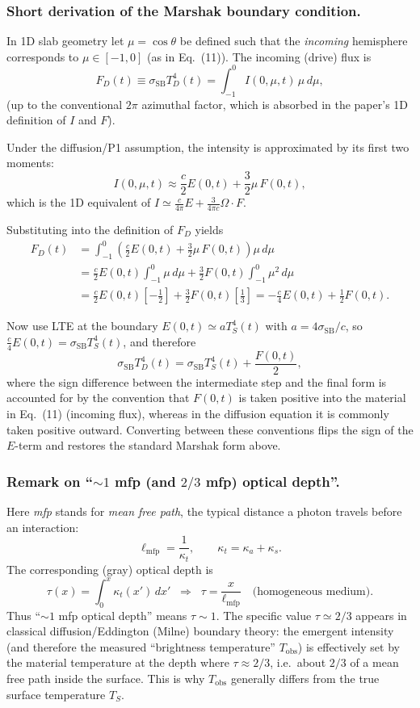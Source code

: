 \documentclass{article}
\begin{document}
\subsubsection*{Short derivation of the Marshak boundary condition.}
In 1D slab geometry let $\mu=\cos\theta$ be defined such that the \emph{incoming}
hemisphere corresponds to $\mu\in[-1,0]$ (as in Eq.~(11)).
The incoming (drive) flux is
\[
F_D(t)\equiv \sigma_{\mathrm{SB}}T_D^4(t)
= \int_{-1}^{0} I(0,\mu,t)\,\mu\,d\mu ,
\]
(up to the conventional $2\pi$ azimuthal factor, which is absorbed in the paper's
1D definition of $I$ and $F$).

Under the diffusion/P1 assumption, the intensity is approximated by its first two
moments:
\[
I(0,\mu,t)\approx \frac{c}{2}E(0,t)+\frac{3}{2}\mu\,F(0,t),
\]
which is the 1D equivalent of $I\simeq \frac{c}{4\pi}E+\frac{3}{4\pi c}\Omega\cdot F$.

Substituting into the definition of $F_D$ yields
\begin{align*}
F_D(t)
&=\int_{-1}^{0}\left(\frac{c}{2}E(0,t)+\frac{3}{2}\mu\,F(0,t)\right)\mu\,d\mu \\
&=\frac{c}{2}E(0,t)\int_{-1}^{0}\mu\,d\mu+\frac{3}{2}F(0,t)\int_{-1}^{0}\mu^2\,d\mu \\
&=\frac{c}{2}E(0,t)\left[-\frac{1}{2}\right]+\frac{3}{2}F(0,t)\left[\frac{1}{3}\right]
= -\frac{c}{4}E(0,t)+\frac{1}{2}F(0,t).
\end{align*}

Now use LTE at the boundary $E(0,t)\simeq aT_S^4(t)$ with $a=4\sigma_{\mathrm{SB}}/c$,
so $\frac{c}{4}E(0,t)=\sigma_{\mathrm{SB}}T_S^4(t)$, and therefore
\[
\sigma_{\mathrm{SB}}T_D^4(t)
= \sigma_{\mathrm{SB}}T_S^4(t)+\frac{F(0,t)}{2},
\]
where the sign difference between the intermediate step and the final form is
accounted for by the convention that $F(0,t)$ is taken positive into the material
in Eq.~(11) (incoming flux), whereas in the diffusion equation it is commonly
taken positive outward. Converting between these conventions flips the sign of
the $E$-term and restores the standard Marshak form above. 

\subsubsection*{Remark on ``$\sim 1$ mfp (and $2/3$ mfp) optical depth''.}
Here \emph{mfp} stands for \emph{mean free path}, the typical distance a photon
travels before an interaction:
\[
\ell_{\mathrm{mfp}}=\frac{1}{\kappa_t},\qquad \kappa_t=\kappa_a+\kappa_s.
\]
The corresponding (gray) optical depth is
\[
\tau(x)=\int_0^x \kappa_t(x')\,dx' \;\;\Rightarrow\;\;
\tau=\frac{x}{\ell_{\mathrm{mfp}}}\quad \text{(homogeneous medium)}.
\]
Thus ``$\sim 1$ mfp optical depth'' means $\tau\sim 1$.
The specific value $\tau\simeq 2/3$ appears in classical diffusion/Eddington
(Milne) boundary theory: the emergent intensity (and therefore the measured
``brightness temperature'' $T_{\mathrm{obs}}$) is effectively set by the material
temperature at the depth where $\tau\approx 2/3$, i.e.\ about $2/3$ of a mean free
path inside the surface. This is why $T_{\mathrm{obs}}$ generally differs from
the true surface temperature $T_S$.
\end{document}
